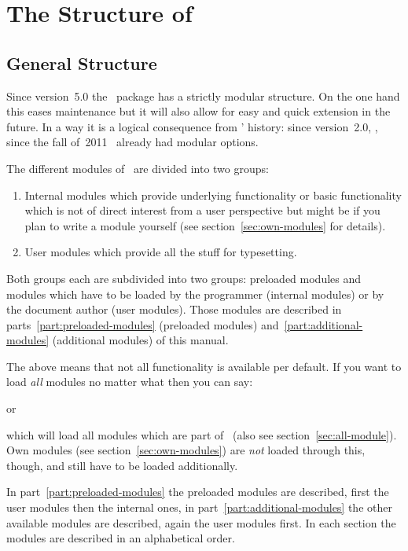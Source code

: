 \documentclass{chemmacros-manual}
\begin{document}
\section{The Structure of \chemmacros}\label{sec:structure-chemmacros}
\subsection{General Structure}
Since version~5.0 the \chemmacros\ package has a strictly modular
structure.  On the one hand this eases maintenance but it
will also allow for easy and quick extension in the future.  In a way it is a
logical consequence from \chemmacros' history: since version~2.0, \ie, since
the fall of~2011 \chemmacros\ already had modular options.

The different modules of \chemmacros\ are divided into two groups:
\begin{enumerate}
  \item Internal modules which provide underlying functionality or basic
    functionality which is not of direct interest from a user perspective but
    might be if you plan to write a module yourself (see
    section~\ref{sec:own-modules} for details).
  \item User modules which provide all the stuff for typesetting.
\end{enumerate}
Both groups each are subdivided into two groups: preloaded modules and modules
which have to be loaded by the programmer (internal modules) or by the
document author (user modules).  Those modules are described in
parts~\ref{part:preloaded-modules} (preloaded modules)
and~\ref{part:additional-modules} (additional modules) of this manual.

The above means that not all functionality is available per default.  If you
want to load \emph{all} modules no matter what then you can say:
\begin{sourcecode}
\end{sourcecode}
or
\begin{sourcecode}
\end{sourcecode}
which will load all modules which are part of \chemmacros\ (also see
section~\vref{sec:all-module}). Own modules (see
section~\vref{sec:own-modules}) are \emph{not} loaded through this, though,
and still have to be loaded additionally.

In part~\vref{part:preloaded-modules} the preloaded modules are described,
first the user modules then the internal ones, in
part~\vref{part:additional-modules} the other available modules are described,
again the user modules first.  In each section the modules are described in
an alphabetical order.
\end{document}
